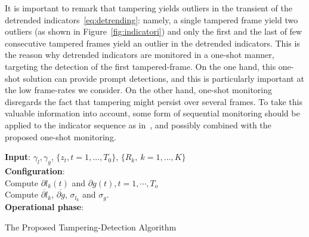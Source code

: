 \documentclass{llncs}
\begin{document}
It is important to remark that tampering yields outliers in the transient of the detrended indicators~\eqref{eq:detrending}: namely, a single tampered frame yield two outliers (as shown in Figure~\ref{fig:indicatori}) and only the first and the last of few consecutive tampered frames yield an outlier in the detrended indicators. This is the reason why detrended indicators are monitored in a one-shot manner, targeting the detection of the first tampered-frame. On the one hand, this one-shot solution can provide prompt detections, and this is particularly important at the low frame-rates we consider. On the other hand, one-shot monitoring disregards the fact that tampering might persist over several frames. To take this valuable information into account, some form of sequential monitoring should be applied to the indicator sequence as in~\cite{alippi2010detecting}, and possibly combined with the proposed one-shot monitoring.
%
\begin{algorithm}[t]
	\LinesNumbered
	\textbf{Input}: $\gamma_l, \gamma_g$, $\{z_t, t = 1, \dots, T_{0}\}$, $\{R_k, \ k=1,\dots,K\}$ \\
	\textbf{Configuration}:\\
	 Compute $\partial l_k(t)$ and $\partial g(t), t = 1, \cdots, T_o$\\ 
	 Compute $\overline{\partial l}_k$, $\overline{\partial g}$, $\sigma_{l_k}$ and $\sigma_{g}$.\\
	
	\textbf{Operational phase}:\\
	    
	\caption{The Proposed Tampering-Detection Algorithm}
	\label{alg:DISPL}
\end{algorithm}
%
\end{document}
